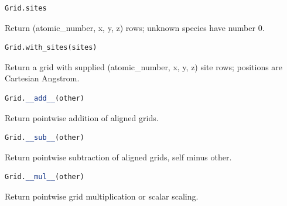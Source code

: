 \begin{samepage}

\begin{lstlisting}[language=Python]
Grid.sites
\end{lstlisting}

Return (atomic\_\allowbreak{}number, x, y, z) rows; unknown species have number 0.

\end{samepage}



\begin{samepage}

\begin{lstlisting}[language=Python]
Grid.with_sites(sites)
\end{lstlisting}

Return a grid with supplied (atomic\_\allowbreak{}number, x, y, z) site rows; positions are Cartesian Angstrom.

\end{samepage}



\begin{samepage}

\begin{lstlisting}[language=Python]
Grid.__add__(other)
\end{lstlisting}

Return pointwise addition of aligned grids.

\end{samepage}



\begin{samepage}

\begin{lstlisting}[language=Python]
Grid.__sub__(other)
\end{lstlisting}

Return pointwise subtraction of aligned grids, self minus other.

\end{samepage}



\begin{samepage}

\begin{lstlisting}[language=Python]
Grid.__mul__(other)
\end{lstlisting}

Return pointwise grid multiplication or scalar scaling.

\end{samepage}



